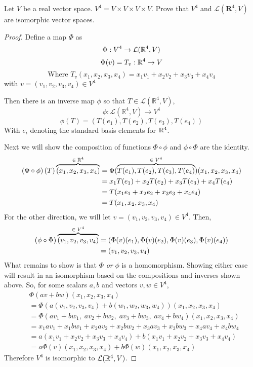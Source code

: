Let $V$ be a real vector space.  $V^4 = V \times V \times V \times V$.  Prove that $V^4$ and $\mathcal{L}(\mathbf{R}^4, V)$ are isomorphic vector spaces.
\begin{mybox}
\begin{proof}
Define a map $\Phi$ as
$$\Phi : V^4 \to \mathcal{L}(\mathbb{R}^4, V)$$
$$\Phi(v) = T_v : \mathbb{R}^4 \to V$$
$$\text{Where } T_v(x_1,x_2,x_3,x_4) = x_1v_1 + x_2v_2 + x_3v_3 + x_4v_4$$
with $v = (v_1, v_2, v_3, v_4) \in V^4$

\nl Then there is an inverse map $\phi$ so that
$T\in \mathcal{L}(\mathbb{R}^4, V)$,
$$\phi : \mathcal{L}(\mathbb{R}^4, V) \to V^4$$ $$\phi(T) = (T(e_1), T(e_2), T(e_3), T(e_4))$$
With $e_i$ denoting the standard basis elements for $\mathbb{R}^4$. 

\nl Next we will show the composition of functions $\Phi \circ \phi$ and $\phi \circ \Phi$ are the identity.
\begin{align*}
    \left( {\Phi \circ \phi} \right)(T)\overbrace{(x_1,x_2,x_3,x_4)}^{\in\;\mathbb{R}^4} &= \Phi (\overbrace{T(e_1), T(e_2), T(e_3), T(e_4)}^{\in \; V^4})(x_1,x_2,x_3,x_4)\\
    &= x_1T(e_1) + x_2 T(e_2) + x_3T(e_3) + x_4T(e_4)\\
    &= T(x_1e_1 + x_2e_2 + x_3e_3 + x_4e_4)\\
    &= T(x_1, x_2, x_3, x_4)
\end{align*}
For the other direction, we will let $v = (v_1, v_2, v_3, v_4) \in V^4$. Then,
\begin{align*}
    \left( {\phi \circ \Phi} \right)\overbrace{(v_1, v_2, v_3, v_4)}^{\in\;V^4} &=(\Phi(v)(e_1), \Phi(v)(e_2), \Phi(v)(e_3), \Phi(v)(e_4))\\
    &=(v_1, v_2, v_3, v_4)\\
\end{align*}
What remains to show is that $\Phi$ \textit{or} $\phi$ is a homomorphism. Showing either case will result in an isomorphism based on the compositions and inverses shown above. So, for some scalars $a, b$ and vectors $v,w \in V^4$,
\begin{align*}
    & \Phi(av + bw)(x_1,x_2,x_3,x_4)\\&= \Phi( a(v_1, v_2, v_3, v_4) + b(w_1, w_2, w_3, w_4))(x_1,x_2,x_3,x_4)\\
    &= \Phi ( av_1 + bw_1,\; av_2 + bw_2,\; av_3 + bw_3,\; av_4 + bw_4)(x_1,x_2,x_3,x_4)\\
    &= x_1av_1 + x_1bw_1 + x_2av_2 + x_2bw_2 + x_3av_3 + x_3bw_3 + x_4av_4 + x_4bw_4\\
    &= a(x_1v_1 + x_2v_2 + x_3v_3 + x_4v_4) + b(x_1v_1 + x_2v_2 + x_3v_3 + x_4v_4)\\
    &= a \Phi(v)(x_1,x_2,x_3,x_4) + b \Phi(w)(x_1,x_2,x_3,x_4)
\end{align*}
Therefore $V^4$ is isomorphic to $\mathcal{L}(\mathbb{R}^4,V)$.
\end{proof}
\end{mybox}